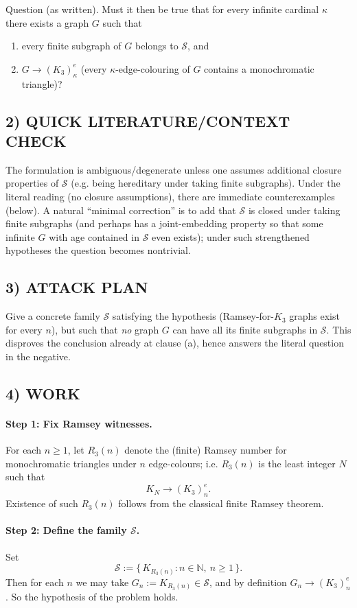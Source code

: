 Question (as written). Must it then be true that for every infinite cardinal $\kappa$ there exists a graph $G$ such that

\begin{enumerate}[label=(\alph*)]
\item every finite subgraph of $G$ belongs to $\mathcal S$, and
\item $G\to (K_3)^{e}_\kappa$ (every $\kappa$-edge-colouring of $G$ contains a monochromatic triangle)?
\end{enumerate}

\subsection*{2) QUICK LITERATURE/CONTEXT CHECK}
The formulation is ambiguous/degenerate unless one assumes additional closure properties of $\mathcal S$ (e.g. being hereditary under taking finite subgraphs). Under the literal reading (no closure assumptions), there are immediate counterexamples (below).  A natural ``minimal correction'' is to add that $\mathcal S$ is closed under taking finite subgraphs (and perhaps has a joint-embedding property so that some infinite $G$ with age contained in $\mathcal S$ even exists); under such strengthened hypotheses the question becomes nontrivial.

\subsection*{3) ATTACK PLAN}
Give a concrete family $\mathcal S$ satisfying the hypothesis (Ramsey-for-$K_3$ graphs exist for every $n$), but such that \emph{no} graph $G$ can have all its finite subgraphs in $\mathcal S$.
This disproves the conclusion already at clause (a), hence answers the literal question in the negative.

\subsection*{4) WORK}
\paragraph{Step 1: Fix Ramsey witnesses.}
For each $n\ge 1$, let $R_3(n)$ denote the (finite) Ramsey number for monochromatic triangles under $n$ edge-colours; i.e.
$R_3(n)$ is the least integer $N$ such that
\[K_N \to (K_3)^e_n.\]
Existence of such $R_3(n)$ follows from the classical finite Ramsey theorem.

\paragraph{Step 2: Define the family $\mathcal S$.}
Set
\[
  \mathcal S := \{\,K_{R_3(n)} : n\in\mathbb N,\ n\ge 1\,\}.
\]
Then for each $n$ we may take $G_n := K_{R_3(n)}\in\mathcal S$, and by definition $G_n\to (K_3)^e_n$.
So the hypothesis of the problem holds.

